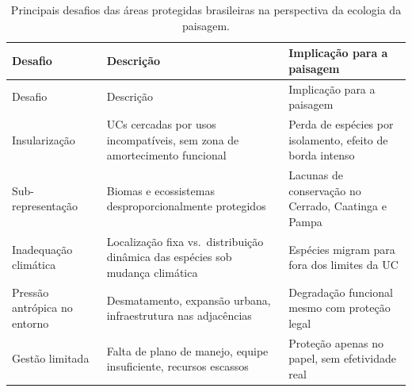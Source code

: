\documentclass[
  portuguese,
  11pt,
  a4paper,
  open=any]{scrbook}
\begin{document}
\begin{longtable}[]{@{}
  >{\raggedright\arraybackslash}p{}
  >{\raggedright\arraybackslash}p{}
  >{\raggedright\arraybackslash}p{}@{}}
\caption{Principais desafios das áreas protegidas brasileiras na
perspectiva da ecologia da
paisagem.}\label{tbl-desafios-aps}\tabularnewline
\toprule\noalign{}
\begin{minipage}[b]{\linewidth}\raggedright
Desafio
\end{minipage} & \begin{minipage}[b]{\linewidth}\raggedright
Descrição
\end{minipage} & \begin{minipage}[b]{\linewidth}\raggedright
Implicação para a paisagem
\end{minipage} \\
\midrule\noalign{}
\endfirsthead
\toprule\noalign{}
\begin{minipage}[b]{\linewidth}\raggedright
Desafio
\end{minipage} & \begin{minipage}[b]{\linewidth}\raggedright
Descrição
\end{minipage} & \begin{minipage}[b]{\linewidth}\raggedright
Implicação para a paisagem
\end{minipage} \\
\midrule\noalign{}
\endhead
\bottomrule\noalign{}
\endlastfoot
Insularização & UCs cercadas por usos incompatíveis, sem zona de
amortecimento funcional & Perda de espécies por isolamento, efeito de
borda intenso \\
Sub-representação & Biomas e ecossistemas desproporcionalmente
protegidos & Lacunas de conservação no Cerrado, Caatinga e Pampa \\
Inadequação climática & Localização fixa vs.~distribuição dinâmica das
espécies sob mudança climática & Espécies migram para fora dos limites
da UC \\
Pressão antrópica no entorno & Desmatamento, expansão urbana,
infraestrutura nas adjacências & Degradação funcional mesmo com proteção
legal \\
Gestão limitada & Falta de plano de manejo, equipe insuficiente,
recursos escassos & Proteção apenas no papel, sem efetividade real \\
\end{longtable}
\end{document}
